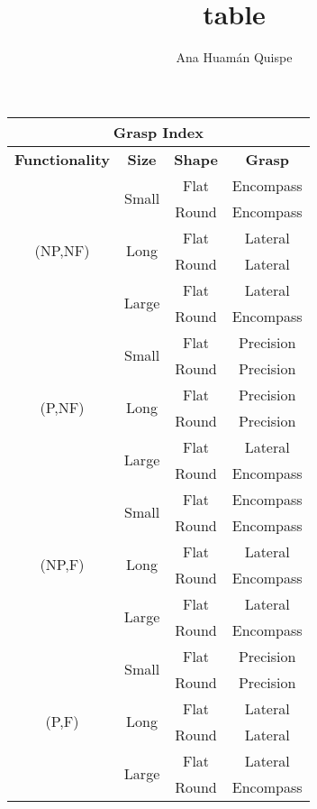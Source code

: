 \documentclass[10pt,a4paper]{article}
\author{Ana Huam\'{a}n Quispe }
\title{table}
\begin{document}
\begin{tabular}{ |c|c|c|c| }
\hline
\multicolumn{4}{|c|}{\textbf{Grasp Index}}\\ \hline
\textbf{Functionality} & \textbf{Size} & \textbf{Shape} & \textbf{Grasp} \\ 
\hline
\multirow{6}{*}{ (NP,NF) } & \multirow{2}{*}{Small} & Flat & Encompass \\
&  & Round & Encompass \\
& \multirow{2}{*}{Long} & Flat & Lateral \\
&  & Round & Lateral \\
& \multirow{2}{*}{Large} & Flat & Lateral \\
&  & Round & Encompass \\
\hline
\multirow{6}{*}{ (P,NF) } & \multirow{2}{*}{Small} & Flat & Precision \\
&  & Round & Precision \\
& \multirow{2}{*}{Long} & Flat & Precision \\
&  & Round & Precision \\
& \multirow{2}{*}{Large} & Flat & Lateral \\
&  & Round & Encompass \\
\hline
\multirow{6}{*}{ (NP,F) } & \multirow{2}{*}{Small} & Flat & Encompass \\
&  & Round & Encompass \\
& \multirow{2}{*}{Long} & Flat & Lateral \\
&  & Round & Encompass \\
& \multirow{2}{*}{Large} & Flat & Lateral \\
&  & Round & Encompass \\
\hline
\multirow{6}{*}{ (P,F) } & \multirow{2}{*}{Small} & Flat & Precision \\
&  & Round & Precision \\
& \multirow{2}{*}{Long} & Flat & Lateral \\
&  & Round & Lateral \\
& \multirow{2}{*}{Large} & Flat & Lateral \\
&  & Round & Encompass \\
\hline
\end{tabular}
\end{document}

